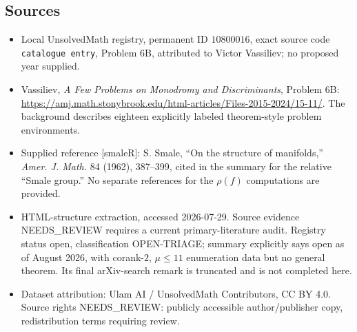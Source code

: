 \documentclass[11pt]{article}
\begin{document}
\subsection{Sources}
\begin{itemize}
\item Local UnsolvedMath registry, permanent ID \(10800016\), exact source code \texttt{catalogue entry}, Problem 6B, attributed to Victor Vassiliev; no proposed year supplied.
\item Vassiliev, \emph{A Few Problems on Monodromy and Discriminants}, Problem 6B: \url{https://amj.math.stonybrook.edu/html-articles/Files-2015-2024/15-11/}. The background describes eighteen explicitly labeled theorem-style problem environments.
\item Supplied reference [smaleR]: S. Smale, ``On the structure of manifolds,'' \emph{Amer. J. Math.} 84 (1962), 387--399, cited in the summary for the relative ``Smale group.'' No separate references for the \(\rho(f)\) computations are provided.
\item HTML-structure extraction, accessed 2026-07-29. Source evidence NEEDS\_REVIEW requires a current primary-literature audit. Registry status open, classification OPEN-TRIAGE; summary explicitly says open as of August 2026, with corank-\(2\), \(\mu\le11\) enumeration data but no general theorem. Its final arXiv-search remark is truncated and is not completed here.
\item Dataset attribution: Ulam AI / UnsolvedMath Contributors, CC BY 4.0. Source rights NEEDS\_REVIEW: publicly accessible author/publisher copy, redistribution terms requiring review.
\end{itemize}
\end{document}
